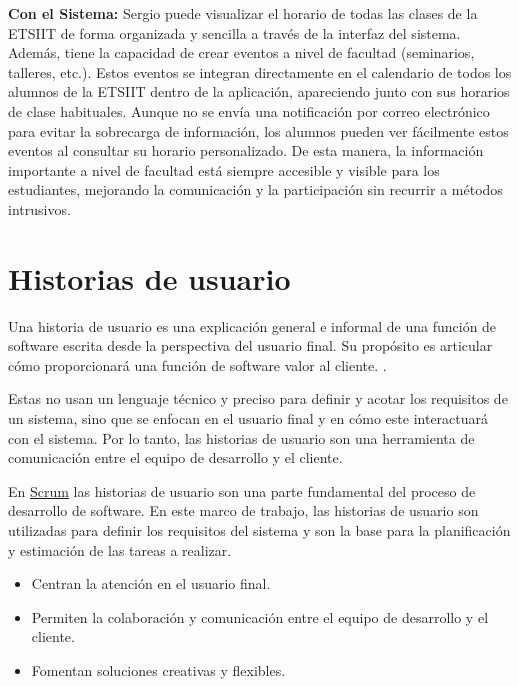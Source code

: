 \textbf{Con el Sistema:} Sergio puede visualizar el horario de todas las clases de la ETSIIT de forma organizada y sencilla a través de la interfaz del sistema. Además, tiene la capacidad de crear eventos a nivel de facultad (seminarios, talleres, etc.). Estos eventos se integran directamente en el calendario de todos los alumnos de la ETSIIT dentro de la aplicación, apareciendo junto con sus horarios de clase habituales. Aunque no se envía una notificación por correo electrónico para evitar la sobrecarga de información, los alumnos pueden ver fácilmente estos eventos al consultar su horario personalizado. De esta manera, la información importante a nivel de facultad está siempre accesible y visible para los estudiantes, mejorando la comunicación y la participación sin recurrir a métodos intrusivos.

\section{Historias de usuario}

Una historia de usuario es una explicación general e informal de una función de software escrita desde la perspectiva
del usuario final. Su propósito es articular cómo proporcionará una función de software valor al cliente. \cite{atlassian_user_stories}.

Estas no usan un lenguaje técnico y preciso para definir y acotar los requisitos de un sistema, sino que se enfocan en
el usuario final y en cómo este interactuará con el sistema. Por lo tanto, las historias de usuario son una herramienta
de comunicación entre el equipo de desarrollo y el cliente.

En \hyperlink{scrum}{Scrum} las historias de usuario son una parte fundamental del proceso de desarrollo de software. En
este marco de trabajo, las historias de usuario son utilizadas para definir los requisitos del sistema y son la base para
la planificación y estimación de las tareas a realizar.
\newline\newline
{}
\begin{itemize}
    \item Centran la atención en el usuario final.
    \item Permiten la colaboración y comunicación entre el equipo de desarrollo y el cliente.
    \item Fomentan soluciones creativas y flexibles.
\end{itemize}
